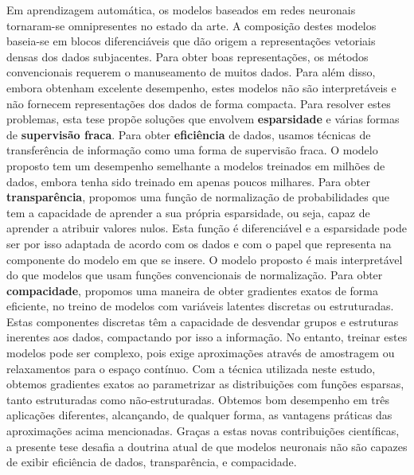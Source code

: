 \begin{resumo}

    \noindent Em aprendizagem automática, os modelos baseados em
    redes neuronais tornaram-se omnipresentes no estado da arte. A composição destes
    modelos baseia-se em blocos diferenciáveis que dão origem a
    representações vetoriais densas dos dados subjacentes. Para obter
    boas representações, os métodos convencionais requerem o manuseamento de muitos
    dados. Para além disso, embora obtenham excelente desempenho,
    estes modelos não são interpretáveis e não fornecem
    representações dos dados de forma compacta. Para resolver estes
    problemas, esta tese propõe soluções que envolvem \textbf{esparsidade} e
    várias formas de \textbf{supervisão fraca}. Para obter \textbf{eficiência} de
    dados, usamos técnicas de transferência de informação como uma
    forma de supervisão fraca. O modelo proposto tem um desempenho
    semelhante a modelos treinados em milhões de dados, embora tenha
    sido treinado em apenas poucos milhares. Para obter
    \textbf{transparência}, propomos uma função de normalização de
    probabilidades que tem a capacidade de aprender a sua própria
    esparsidade, ou seja, capaz de aprender a atribuir valores nulos.
    Esta função é diferenciável e a esparsidade pode ser por isso
    adaptada de acordo com os dados e com o papel que representa na
    componente do modelo em que se insere. O modelo proposto é mais
    interpretável do que modelos que usam funções convencionais de
    normalização. Para obter \textbf{compacidade}, propomos uma maneira de
    obter gradientes exatos de forma eficiente, no treino de modelos
    com variáveis latentes discretas ou estruturadas. Estas
    componentes discretas têm a capacidade de desvendar grupos e
    estruturas inerentes aos dados, compactando por isso a
    informação. No entanto, treinar estes modelos pode ser complexo,
    pois exige aproximações através de amostragem ou relaxamentos
    para o espaço contínuo. Com a técnica utilizada neste estudo, obtemos gradientes
    exatos ao parametrizar as distribuições com funções esparsas,
    tanto estruturadas como não-estruturadas. Obtemos bom desempenho
    em três aplicações diferentes, alcançando, de qualquer forma, as
    vantagens práticas das aproximações acima mencionadas. Graças a
    estas novas contribuições científicas, a presente tese desafia a
    doutrina atual de que modelos neuronais não são capazes de exibir
    eficiência de dados, transparência, e compacidade.



\end{resumo}
